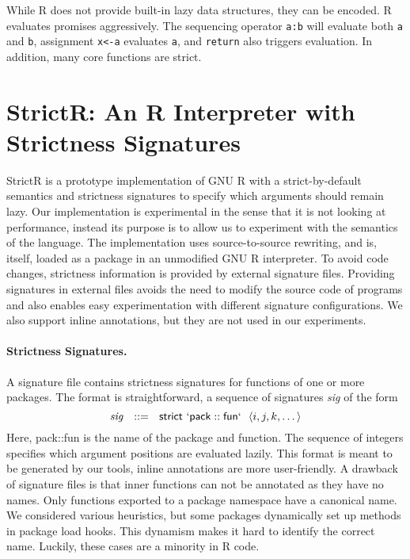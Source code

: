 \documentclass[review,creen,acmsmall]{acmart}
\newcommand{\code}[1]{\lstinline |#1|\xspace}
\newcommand{\strictr}{{\sf StrictR}\xspace}
\begin{document}
\noindent
While R does not provide built-in lazy data structures, they can be encoded. R
evaluates promises aggressively. The sequencing operator \code{a:b} will
evaluate both \code a and \code b, assignment \code{x<-a} evaluates \code a, and
\code{return} also triggers evaluation. In addition, many core functions are
strict.

\newpage %
\section{StrictR: An R Interpreter with Strictness Signatures}\label{sec:strictr}

\strictr is a prototype implementation of GNU R with a strict-by-default
semantics and strictness signatures to specify which arguments should remain
lazy. Our implementation is experimental in the sense that it is not looking at
performance, instead its purpose is to allow us to experiment with the semantics
of the language. The implementation uses source-to-source rewriting, and is,
itself, loaded as a package in an unmodified GNU R interpreter. To avoid code
changes, strictness information is provided by external signature files.
Providing signatures in external files avoids the need to modify the source code
of programs and also enables easy experimentation with different signature
configurations. We also support inline annotations, but they are not used in our
experiments.


\paragraph{Strictness Signatures.}
A signature file contains strictness signatures for functions of one or more
packages. The format is straightforward, a sequence of signatures \emph{sig} of
the form
%
\[
\mathit{sig}~~::=~~\mathsf{strict}~\mathsf{`pack}::\mathsf{fun`}~~\langle i, j, k, \dots\rangle
\]
%
Here, {\sf pack::fun} is the name of the package and function. The sequence of
integers specifies which argument positions are evaluated lazily. This format is
meant to be generated by our tools, inline annotations are more user-friendly. A
drawback of signature files is that inner functions can not be annotated as they
have no names. Only functions exported to a package namespace have a canonical
name. We considered various heuristics, but some packages dynamically set up
methods in package load hooks. This dynamism makes it hard to identify the
correct name. Luckily, these cases are a minority in R code.
\end{document}
